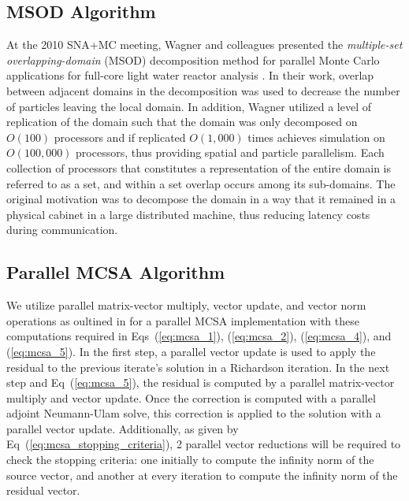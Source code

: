 \documentclass{snamc2013}
\begin{document}
\subsection{MSOD Algorithm}
At the 2010 SNA+MC meeting, Wagner and colleagues presented the
\textit{multiple-set overlapping-domain} (MSOD) decomposition method
for parallel Monte Carlo applications for full-core light water
reactor analysis \cite{wagner_hybrid_2010}. In their work, overlap
between adjacent domains in the decomposition was used to decrease the
number of particles leaving the local domain. In addition, Wagner
utilized a level of replication of the domain such that the domain was
only decomposed on $O(100)$ processors and if replicated $O(1,000)$
times achieves simulation on $O(100,000)$ processors, thus providing
spatial and particle parallelism. Each collection of processors that
constitutes a representation of the entire domain is referred to as a
set, and within a set overlap occurs among its sub-domains. The
original motivation was to decompose the domain in a way that it
remained in a physical cabinet in a large distributed machine, thus
reducing latency costs during communication.



\subsection{Parallel MCSA Algorithm}
We utilize parallel matrix-vector multiply, vector update, and vector
norm operations as oultined in \cite{saad_iterative_2003} for a
parallel MCSA implementation with these computations required in
Eqs~(\ref{eq:mcsa_1}), (\ref{eq:mcsa_2}), (\ref{eq:mcsa_4}), and
(\ref{eq:mcsa_5}). In the first step, a parallel vector update is used
to apply the residual to the previous iterate's solution in a
Richardson iteration. In the next step and Eq~(\ref{eq:mcsa_5}), the
residual is computed by a parallel matrix-vector multiply and vector
update. Once the correction is computed with a parallel adjoint
Neumann-Ulam solve, this correction is applied to the solution with a
parallel vector update. Additionally, as given by
Eq~(\ref{eq:mcsa_stopping_criteria}), 2 parallel vector reductions
will be required to check the stopping criteria: one initially to
compute the infinity norm of the source vector, and another at every
iteration to compute the infinity norm of the residual vector.
\end{document}
